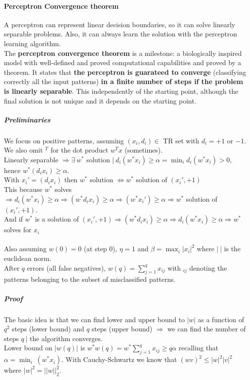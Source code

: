 \documentclass[10pt]{report}
\begin{document}
\paragraph{Perceptron Convergence theorem} A perceptron can represent linear decision boundaries, so it can solve linearly separable problems. Also, it can always learn the solution with the perceptron learning algorithm.\\
The \textbf{perceptron convergence theorem} is a milestone: a biologically inspired model with well-defined and proved computational capabilities and proved by a theorem. It states that \textbf{the perceptron is guarateed to converge} (classifying correctly all the input patterns) \textbf{in a finite number of steps if the problem is linearly separable}. This independently of the starting point, although the final solution is not unique and it depends on the starting point.
\subparagraph{Preliminaries} We focus on positive patterns, assuming $(x_i, d_i)\in$ TR set with $d_i = +1$ or $-1$. We also omit $^T$ for the dot product $w^T x$ (sometimes).\\
Linearly separable $\Rightarrow\exists\: w^*$ solution $|\:d_i(w^* x_i)\geq \alpha = \min_i d_i(w^*x_i) > 0$, hence $w^*(d_ix_i)\geq \alpha$.\\
With $x_i' = (d_ix_i)$ then $w^*$ solution $\Leftrightarrow w^*$ solution of $(x_i', +1)$\\
This because $w^*$ solves $\Rightarrow d_i(w^*x_i) \geq \alpha \Rightarrow (w^*d_ix_i)\geq\alpha\Rightarrow (w^*x_i')\geq\alpha \Rightarrow w^*$ solution of $(x_i', +1)$.\\
And if $w^*$ is a solution of $(x_i', +1)\Rightarrow(w^*d_ix_i)\geq \alpha\Rightarrow d_i(w^*x_i)\geq \alpha\Rightarrow w^*$ solves for $x_i$\\\\
Also assuming $w(0) = 0$ (at step $0$), $\eta = 1$ and $\beta = \max_i |x_i|^2$ where $|\:|$ is the euclidean norm.\\
After $q$ errors (all false negatives), $w(q) = \sum_{j=1}^q x_{ij}$ with $_{ij}$ denoting the patterns belonging to the subset of misclassified patterns.
\subparagraph{Proof} The basic idea is that we can find lower and upper bound to $|w|$ as a function of $q^2$ steps (lower bound) and $q$ steps (upper bound) $\Rightarrow$ we can find the number of steps $q\:|$ the algorithm converges.\\
Lower bound on $|w(q)|$ is $w^* w(q) = w^*\sum_{j=1}^q x_{ij}\geq q\alpha$ recalling that $\alpha=\min_i\:(w^*x_i)$. With Cauchy-Schwartz we know that $(wv)^2 \leq |w|^2|v|^2$ where $|w|^2 = ||w||_2 ^2$.\\
\end{document}
